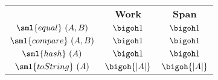 \begin{costspec}[IntElt]

\begin{tabular}{c|c|c}
& \textbf{Work} & \textbf{Span} \\
$\sml{equal}~(A,B)$ & $\bigoh 1$ & $\bigoh 1$ \\
$\sml{compare}~(A,B)$ & $\bigoh 1$ & $\bigoh 1$ \\
$\sml{hash}~(A)$ & $\bigoh 1$ & $\bigoh 1$ \\
$\sml{toString}~(A)$ & $\bigoh{|A|}$ & $\bigoh{|A|}$ \\
\end{tabular}
\end{costspec}
    